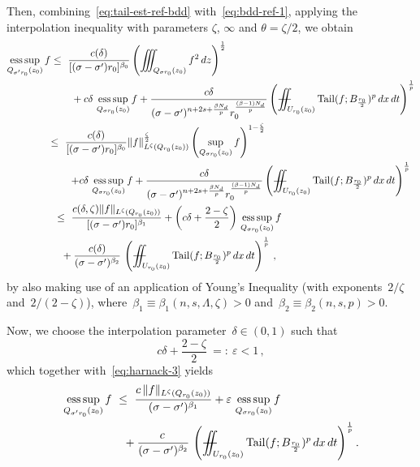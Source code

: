 \documentclass[leqno,10pt]{amsart}
\theoremstyle{plain}
\theoremstyle{remark}
\numberwithin{equation}{section}
\DeclareMathOperator*{\tail}{{\rm Tail}}
\def\dx{\,{\rm d}x}
\def\dt{\,{\rm d}t}
\def \d{\,{\rm d}}
\newcommand{\eps}{\varepsilon}
\def\Xiint#1{\mathchoice
    {\XXiint\displaystyle\textstyle{#1}}%
    {\XXiint\textstyle\scriptstyle{#1}}%
    {\XXiint\scriptstyle\scriptscriptstyle{#1}}%
    {\XXiint\scriptscriptstyle\scriptscriptstyle{#1}}%
    \!\iint}
\def\XXiint#1#2#3{\setbox0=\hbox{$#1{#2#3}{\iint}$}
    \vcenter{\hbox{$#2#3$}}\kern-0.5\wd0}
\def\biint{\Xiint{-\!-}}
\begin{document}
{  
  

  Then, combining~\eqref{eq:tail-est-ref-bdd} with~\eqref{eq:bdd-ref-1},
  applying the interpolation inequality with parameters $\zeta$, $\infty$ and $\theta=\zeta/2$,
  we obtain 	
  \begin{equation}\label{eq:harnack-3}
        \begin{aligned}
    		\operatorname*{ess\,sup}_{{Q}_{\sigma'r_{0}}(z_{0})}f 
		& \leq \  \frac{c(\delta)}{[(\sigma-\sigma')r_{0}]^{\beta_{0}}}\left(\iiint_{{Q}_{\sigma r_{0}}(z_{0})}f^2 \d z\right)^\frac{1}{2}\\
		&\qquad  + c\delta \, \operatorname*{ess\,sup}_{{Q}_{\sigma r_{0}}(z_{0})}f  
		+ \frac{c\delta}{(\sigma-\sigma')^{n+2s+\frac{\beta N_{\rm d}}{p}}  { r_0^{\frac{(\beta - 1)N_d}{p} }}}    \left(\biint_{U_{r_{0}}(z_0)}\tail(f; B_\frac{r_{0}}{2})^{p}\dx\dt\right)^\frac{1}{p}\\
		&{ \leq \  \frac{c(\delta)}{[(\sigma-\sigma')r_{0}]^{\beta_{0}}}\| f \|_{L^\zeta({Q}_{r_{0}}(z_{0}) ) }^{\frac{\zeta}{2}} \left(  \sup_{{Q}_{\sigma r_{0}}(z_{0})}f \right)^{1-\frac{\zeta}{2}}}\\
		&\qquad { + c\delta \, \operatorname*{ess\,sup}_{{Q}_{\sigma r_{0}}(z_{0})}f  
		+ \frac{c\delta}{(\sigma-\sigma')^{n+2s+\frac{\beta N_{\rm d}}{p}}  { r_0^{\frac{(\beta - 1)N_d}{p} }}}    \left(\biint_{U_{r_{0}}(z_0)}\tail(f; B_\frac{r_{0}}{2})^{p}\dx\dt\right)^\frac{1}{p}} \\
		&\  \leq \  \frac{c(\delta, {\zeta} )\|f\|_{L^\zeta({Q}_{r_{0}}(z_{0}))} }{[(\sigma-\sigma')r_{0}]^{\beta_1}}  +\left(c\delta+\frac{2-\zeta}{2}\right)\, \operatorname*{ess\,sup}_{{Q}_{\sigma r_{0}}(z_{0})}f\\
    		& \quad   + \frac{c(\delta)}{(\sigma-\sigma')^{\beta_2}}\,\left(\biint_{U_{r_{0}}(z_0)}\tail(f; B_\frac{r_{0}}{2})^{p}\dx\dt\right)^\frac{1}{p}\,,
        \end{aligned}
    	\end{equation}
by also making use of an application of Young's Inequality (with exponents~$2/\zeta$ and~$2/(2-\zeta)$), where~$\beta_1 \equiv \beta_1(n,s,\Lambda, {\zeta})>0$ and~$\beta_2 \equiv \beta_2(n,s,p)>0$.


    Now, we choose the interpolation parameter~$\delta \in (0,1)$ such that 
       \[
    		c\delta +\frac{2-\zeta}{2}  \ =: \  \eps <1\,, 
       \]
    	which together with~\eqref{eq:harnack-3}  yields
    	\[
        \begin{aligned}
    		\operatorname*{ess\,sup}_{{Q}_{\sigma'r_{0}}(z_{0})} f
    		&  \ \leq  \ \frac{c\,\|f\|_{L^\zeta({Q}_{r_{0}}(z_{0}))} }{(\sigma-\sigma')^{\beta_1}}  +\eps\, \operatorname*{ess\,sup}_{{Q}_{\sigma r_{0}}(z_{0})}f \\
             & \quad + \frac{c\,}{(\sigma-\sigma')^{\beta_2}}\,\left(\biint_{U_{r_{0}}(z_0)}\tail(f; B_\frac{r_{0}}{2})^{p}\dx\dt\right)^\frac{1}{{p}}\notag.
    	\end{aligned}
        \]

}
\end{document}
